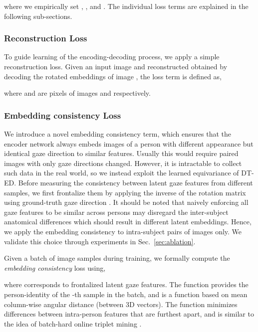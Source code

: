 \documentclass[10pt,twocolumn,letterpaper]{article}
\begin{document}
where we empirically set , , and .
The individual loss terms are explained in the following sub-sections.


\subsubsection{Reconstruction Loss}
To guide learning of the encoding-decoding process, we apply a simple  reconstruction loss.
Given an input image  and reconstructed  obtained by decoding the rotated embeddings  of image , the loss term is defined as,

where  and  are pixels of images  and  respectively.


\subsubsection{Embedding consistency Loss}
\label{sec:embedding consistency}

We introduce a novel embedding consistency term, which ensures that the encoder network always embeds images of a person with different appearance but identical gaze direction to similar features. 
Usually this would require paired images with only gaze directions changed. However, it is intractable to collect such data in the real world, so we instead exploit
the learned equivariance of DT-ED.
Before measuring the consistency between latent gaze features from different samples, we first frontalize them by applying the inverse of the rotation matrix  using ground-truth gaze direction . It should be noted that naively enforcing all gaze features to be similar across persons may disregard the inter-subject anatomical differences which should result in different latent embeddings. Hence, we apply the embedding consistency to intra-subject pairs of images only. 
We validate this choice through experiments in Sec.~\ref{sec:ablation}.




Given a batch of  image samples during training, we formally compute the \emph{embedding consistency} loss using,

where  corresponds to frontalized latent gaze features. The function  provides the person-identity of the -th sample in the batch, and  is a function based on mean column-wise angular distance (between 3D vectors).
The  function minimizes differences between intra-person features that are furthest apart, and is similar to the idea of batch-hard online triplet mining \cite{Schroff2015CVPR}.
\end{document}
